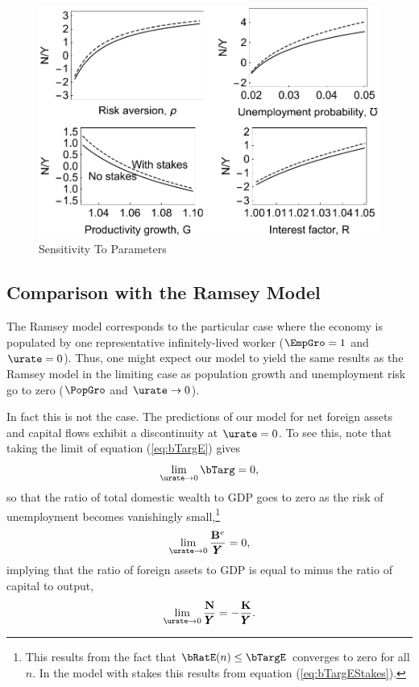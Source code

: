 \documentclass[titlepage]{\econtex}\newcommand{\texname}{cjSOE}
\renewcommand{\GDPLev}{\ensuremath{\pmb{Y}}}
\begin{document}
\medskip
\begin{figure}
\includegraphics{./Figures/sensitivity}
\caption{Sensitivity To Parameters}\label{fig:sensitivity}
\end{figure}

\hypertarget{Translate-To-Realistic-Model}{}
\medskip

% 

\subsection{Comparison with the Ramsey Model}

The Ramsey model corresponds to the particular case where the economy is populated by one representative infinitely-lived worker ($\EmpGro=1$ and $\urate=0$). Thus, one might expect our model to yield the same results as the Ramsey model in the limiting case as population growth and unemployment risk go to zero ($\PopGro$ and $\urate \rightarrow 0$).

In fact this is not the case. The predictions of our model for net foreign assets and capital flows exhibit a discontinuity at $\urate=0$. To see this, note that taking the limit of equation (\ref{eq:bTargE}) gives
\begin{equation*}
\lim_{\urate \rightarrow 0} \bTarg=0,
\end{equation*}
so that the ratio of total domestic wealth to GDP goes to zero as the risk of unemployment becomes vanishingly small,\footnote{This results from the fact that $\bRatE(n) \leq \bTargE$ converges to zero for all $n$. In the model with stakes this results from equation (\ref{eq:bTargEStakes}). }
\begin{equation*}
\lim_{\urate \rightarrow 0} \frac{\BLevE}{\GDPLev}=0,
\end{equation*}
implying that the ratio of foreign assets to GDP is equal to minus the ratio of capital to output,
\begin{equation}
\lim_{\urate \rightarrow 0} \frac{\NFALev}{\GDPLev}=-\frac{\KLev}{\GDPLev}.
\label{eq:NFARatIfUGt0}
\end{equation}
\end{document}
